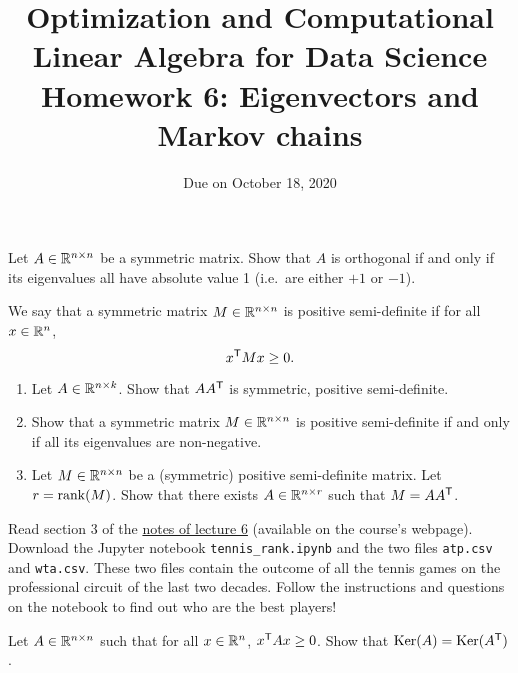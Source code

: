 \documentclass[11pt,nocut]{article}
\title{\vspace{-2.0cm}%
	Optimization and Computational Linear Algebra for Data Science\\
Homework 6: Eigenvectors and Markov chains}
\date{\vspace{-1cm}Due on October 18, 2020}
\begin{document}
\maketitle




\begin{problem}[2 points]
	Let $A \in \mathbb{R}^{n \times n}$ be a symmetric matrix. Show that $A$ is orthogonal if and only if its eigenvalues all have absolute value 1 (i.e.\ are either $+1$ or $-1$).
\end{problem}

\vspace{1mm}

\begin{problem}[3 points]
	We say that a symmetric matrix $M \in \mathbb{R}^{n \times n}$ is positive semi-definite if for all $x \in \mathbb{R}^n$,
	$$
	x^{{\sf T}} M x \geq 0.
	$$
	\begin{enumerate}[label=\normalfont(\textbf{\alph*})]
		\item Let $A \in \mathbb{R}^{n \times k}$. Show that $A A^{{\sf T}}$ is symmetric, positive semi-definite.
		\item Show that a symmetric matrix $M \in \mathbb{R}^{n \times n}$ is positive semi-definite if and only if all its eigenvalues are non-negative.
		\item Let $M \in \mathbb{R}^{n \times n}$ be a (symmetric) positive semi-definite matrix. Let $r = {{\rm rank}}(M)$. Show that there exists $A \in \mathbb{R}^{n \times r}$ such that $M = AA^{{\sf T}}$.
	\end{enumerate}
	
\end{problem}

\vspace{1mm}


\begin{problem}[5 points]
	Read section 3 of the \href{https://github.com/leomiolane/linalg-for-ds/raw/master/lectures/lecture_06/lecture_06.pdf}{notes of lecture 6} (available on the course's webpage).
	Download the Jupyter notebook \texttt{tennis\_rank.ipynb} and the two files \texttt{atp.csv} and \texttt{wta.csv}. These two files contain the outcome of all the tennis games on the professional circuit of the last two decades.
	Follow the instructions and questions on the notebook to find out who are the best players!
\end{problem}


\vspace{1mm}




\begin{problem}[$\star$]
	Let $A \in \mathbb{R}^{n \times n}$ such that for all $x \in \mathbb{R}^n$, $x^{{\sf T}} A x \geq 0$. Show that ${{\rm Ker}}(A) = {{\rm Ker}}(A^{{\sf T}})$.
\end{problem}
\vspace{1cm}
\centerline{}

%
%
\end{document}

